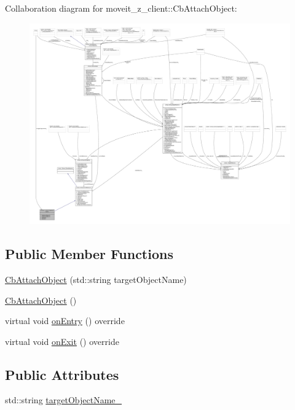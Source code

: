 Collaboration diagram for moveit\+\_\+z\+\_\+client\+:\+:Cb\+Attach\+Object\+:
\nopagebreak
\begin{figure}[H]
\begin{center}
\leavevmode
\includegraphics[width=350pt]{classmoveit__z__client_1_1CbAttachObject__coll__graph}
\end{center}
\end{figure}
\subsection*{Public Member Functions}
\begin{DoxyCompactItemize}
\item 
\hyperlink{classmoveit__z__client_1_1CbAttachObject_a76a7f1dc7db9d3989de973ff2d1f5029}{Cb\+Attach\+Object} (std\+::string target\+Object\+Name)
\item 
\hyperlink{classmoveit__z__client_1_1CbAttachObject_a089ba4999f04dd5aa0826b5116ebb78a}{Cb\+Attach\+Object} ()
\item 
virtual void \hyperlink{classmoveit__z__client_1_1CbAttachObject_ad6b02ebdaf8b6d93f3d00bc901e33bcd}{on\+Entry} () override
\item 
virtual void \hyperlink{classmoveit__z__client_1_1CbAttachObject_a69509674d6180e33a7ab230f06c86cf0}{on\+Exit} () override
\end{DoxyCompactItemize}
\subsection*{Public Attributes}
\begin{DoxyCompactItemize}
\item 
std\+::string \hyperlink{classmoveit__z__client_1_1CbAttachObject_ad088ec4515832f106bd87606987d51d2}{target\+Object\+Name\+\_\+}
\end{DoxyCompactItemize}


